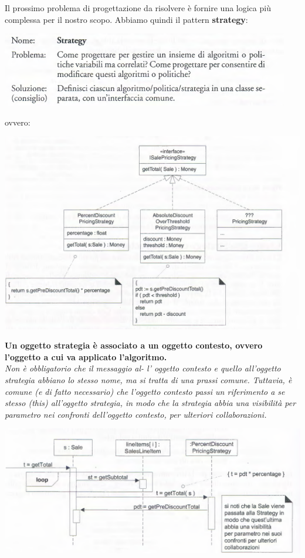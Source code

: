 \documentclass[a4paper,12pt, oneside]{book}
\begin{document}
Il prossimo problema di progettazione da risolvere è fornire una logica più complessa per il nostro scopo. Abbiamo quindi il pattern \textbf{strategy}:
\begin{center}
\includegraphics[scale = 0.7]{img/gof11.png}
\end{center}
ovvero:
\begin{center}
\includegraphics[scale = 0.7]{img/gof12.png}
\end{center}
\textbf{Un oggetto strategia è associato a un oggetto contesto, ovvero l'oggetto a cui va applicato l'algoritmo.}\\
\textit{Non è obbligatorio che il messaggio al-
l' oggetto contesto e quello all'oggetto strategia abbiano lo stesso nome, ma si tratta di una prassi comune. Tuttavia, è
comune (e di fatto necessario) che l'oggetto contesto passi un riferimento a se stesso
(this) all'oggetto strategia, in modo che la strategia abbia una visibilità per parametro nei
confronti dell'oggetto contesto, per ulteriori collaborazioni.}
\begin{center}
\includegraphics[scale = 0.7]{img/gof13.png}
\end{center}
\end{document}
